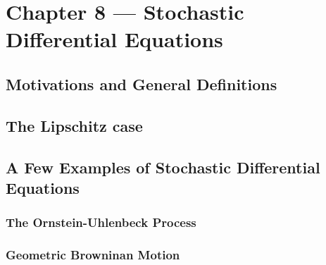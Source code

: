 \section{Chapter 8 --- Stochastic Differential Equations}

\subsection{Motivations and General Definitions}

\subsection{The Lipschitz case}

\setcounter{subsection}{3}
\subsection{A Few Examples of Stochastic Differential Equations}

\subsubsection{The Ornstein-Uhlenbeck Process}

\subsubsection{Geometric Browninan Motion}